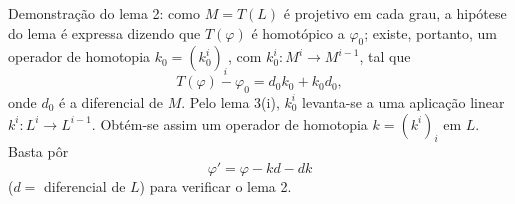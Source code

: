 Demonstração do lema 2: como $M=T(L)$ é projetivo em cada grau, a hipótese do lema é expressa dizendo que $T(\varphi)$ é homotópico a $\varphi_0$; existe, portanto, um operador de homotopia $k_0=(k_0^i)_i$, com $k_0^i:M^i\to M^{i-1}$, tal que
\[
T(\varphi)-\varphi_0=d_0k_0+k_0d_0,
\]
onde $d_0$ é a diferencial de $M$. Pelo lema 3(i), $k_0^i$ levanta-se a uma aplicação linear $k^i:L^i\to L^{i-1}$. Obtém-se assim um operador de homotopia $k=(k^i)_i$ em $L$. Basta pôr
\[
\varphi'=\varphi-kd-dk
\]
($d=$ diferencial de $L$) para verificar o lema 2.
